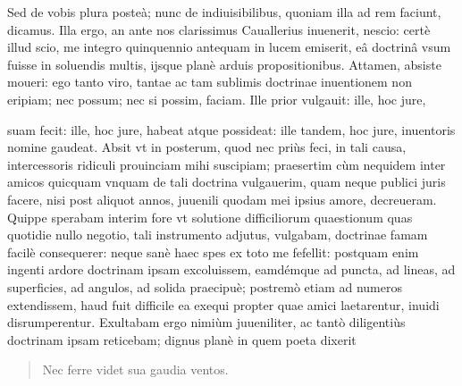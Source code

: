 \documentclass[11pt,a4paper]{article}
\begin{document}
Sed de vobis plura posteà; nunc de indiuisibilibus, quoniam illa ad rem faciunt, dicamus. Illa ergo, an ante nos clarissimus Cauallerius inuenerit, nescio: certè illud scio, me integro quinquennio antequam in lucem emiserit, eâ doctrinâ vsum fuisse in soluendis multis, ijsque planè arduis propositionibus. Attamen, absiste moueri: ego tanto viro, tantae ac tam sublimis doctrinae inuentionem non eripiam; nec possum; nec si possim, faciam. Ille prior vulgauit: ille, hoc jure,


suam fecit: ille, hoc jure, habeat atque possideat: ille tandem, hoc jure, inuentoris nomine gaudeat. Absit vt in posterum, quod nec priùs feci, in tali causa, intercessoris ridiculi prouinciam mihi suscipiam; praesertim cùm nequidem inter amicos quicquam vnquam de tali doctrina vulgauerim, quam neque publici juris facere, nisi post aliquot annos, juuenili quodam mei ipsius amore, decreueram. Quippe sperabam interim fore vt solutione difficiliorum quaestionum quas quotidie nullo negotio, tali instrumento adjutus, vulgabam, doctrinae famam facilè consequerer: neque sanè haec spes ex toto me fefellit: postquam enim ingenti ardore doctrinam ipsam excoluissem, eamdémque ad puncta, ad lineas, ad superficies, ad angulos, ad solida praecipuè; postremò etiam ad numeros extendissem, haud fuit difficile ea exequi propter quae amici laetarentur, inuidi disrumperentur. Exultabam ergo nimiùm juueniliter, ac tantò diligentiùs doctrinam ipsam reticebam; dignus planè in quem poeta dixerit

\begin{quote}
Nec ferre videt sua gaudia ventos.
\end{quote}
\end{document}
